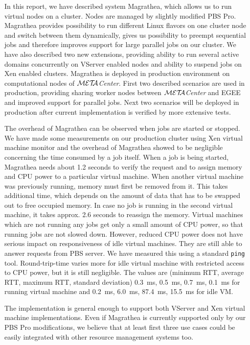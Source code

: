 \documentclass[a4paper]{article}
\def\META#1{\textit{${\cal MET\!\!A}$#1}}
\begin{document}
In this report, we have described system Magrathea, which allows us to run
virtual nodes on a cluster. Nodes are managed by slightly modified PBS Pro.
Magrathea provides possibility to run different Linux flavors on one cluster
node and switch between them dynamically, gives us possibility to preempt
sequential jobs and therefore improves support for large parallel jobs on our
cluster. We have also described two new extensions, providing ability to run
several active domains concurrently on VServer enabled nodes and ability to
suspend jobs on Xen enabled clusters. Magrathea is deployed in production
environment on computational nodes of \META{Center}. First two described
scenarios are used in production, providing sharing worker nodes between
\META{Center} and EGEE and improved support for parallel jobs. Next two
scenarios will be deployed in production after current implementation is
verified by more extensive tests.

The overhead of Magrathea can be observed when jobs are started or stopped. We
have made some measurements on our production cluster using Xen virtual
machine monitor and the overhead of Magrathea showed to be negligible
concerning the time consumed by a job itself. When a job is being started,
Magrathea needs about 1.2 seconds to verify the request and to assign memory
and CPU power to a particular virtual machine. When another virtual machine
was previously running, memory must first be removed from it. This takes
additional time, which depends on the amount of data that has to be swapped
out to free occupied memory. In case no job is running in the second virtual
machine, it takes approx. 2.6 seconds to reassign the memory. Virtual machines
which are not running any jobs get only a small amount of CPU power, so that
running jobs are not slowed down. However, reduced CPU power does not have
serious impact on responsiveness of idle virtual machines. They are still able
to answer requests from PBS server. We have measured this using a standard
\texttt{ping} tool. Round-trip-time varies more for idle virtual machine with
restricted access to CPU power, but it is still negligible. The values are
(minimum RTT, average RTT, maximum RTT, standard deviation) 0.3~ms, 0.5~ms,
0.7~ms, 0.1~ms for running virtual machine and 0.2~ms, 6.0~ms, 87.4~ms,
15.5~ms for idle VM.

The implementation is general enough to support both VServer and Xen virtual
machine implementations. Even if Magrathea is currently supported only by our
PBS Pro modifications, we believe that at least first three use cases could be
easily integrated with other resource management systems too.
\end{document}
